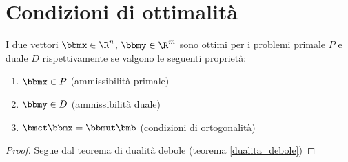 \documentclass[\main/main.tex]{subfiles}
\begin{document}
\section{Condizioni di ottimalità}
\begin{theorem}
  I due vettori $\bbmx \in \R^n$,  $\bbmy \in \R^m$ sono ottimi per i problemi primale $P$ e duale $D$ rispettivamente se valgono le seguenti proprietà:
  \begin{enumerate}
    \item $\bbmx \in P$ (ammissibilità primale)
    \item $\bbmy \in D$ (ammissibilità duale)
    \item $\bmct \bbmx = \bbmut \bmb$ (condizioni di ortogonalità)
  \end{enumerate}
\end{theorem}

\begin{proof}
  Segue dal teorema di dualità debole (teorema \ref{dualita_debole})
\end{proof}
\end{document}
